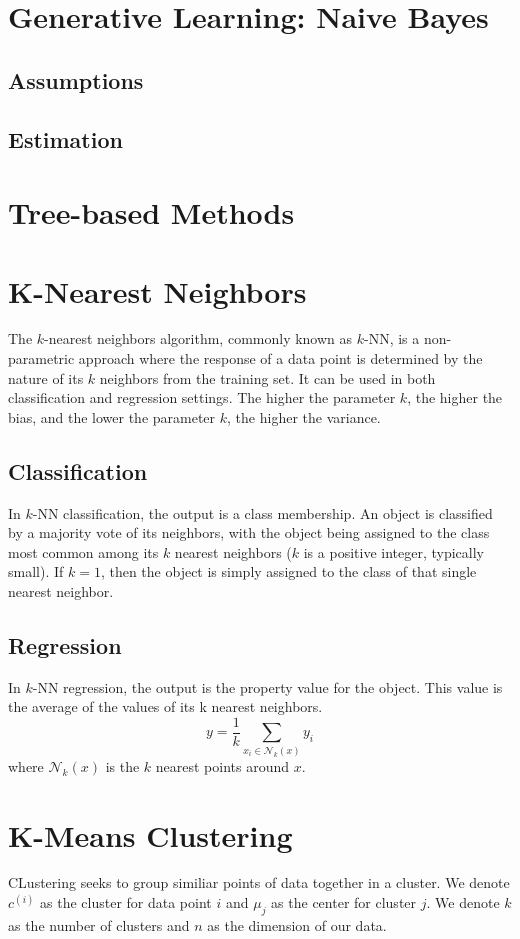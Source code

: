 \documentclass[twoside,twocolumn]{article}
\begin{document}
\section{Generative Learning: Naive Bayes}
\subsection{Assumptions}
\subsection{Estimation}
\section{Tree-based Methods}
\section{K-Nearest Neighbors}
The $k$-nearest neighbors algorithm, commonly known as
$k$-NN, is a non-parametric approach where the response of a data point
is determined by the nature of its $k$ neighbors from the training set.
It can be used in both classification and regression settings.
The higher the parameter $k$, the higher the bias, and the lower the parameter
$k$, the higher the variance.
\subsection{Classification}
In $k$-NN classification, the output is a class membership. An object is
classified by a majority vote of its neighbors, with the object being assigned
to the class most common among its $k$ nearest neighbors ($k$ is a positive integer,
typically small). If $k = 1$, then the object is simply assigned to the class
of that single nearest neighbor.
\subsection{Regression}
In $k$-NN regression, the output is the property value for the object.
This value is the average of the values of its k nearest neighbors.
\begin{equation} y = \frac{1}{k} \sum_{x_i \in \mathcal{N}_k(x)} y_i \end{equation}
where $\mathcal{N}_k(x)$ is the $k$ nearest points around $x$.
\section{K-Means Clustering}
CLustering seeks to group similiar points of data together in a cluster. We
denote $c^{(i)}$ as the cluster for data point $i$ and $\mu_j$ as the center
for cluster $j$. We denote $k$ as the number of clusters and $n$ as the
dimension of our data.
\end{document}
